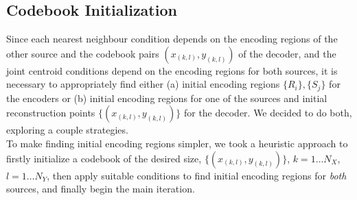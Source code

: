 



\subsection{Codebook Initialization}

Since each nearest neighbour condition depends on the encoding regions of the other source and the codebook pairs $(x_{(k,l)},y_{(k,l)})$ of the decoder, and the joint centroid conditions depend on the encoding regions for both sources, it is necessary to appropriately find either (a) initial encoding regions $\{R_i\}, \{S_j\}$ for the encoders or (b) initial encoding regions for one of the sources and initial reconstruction points $\{(x_{(k,l)}, y_{(k,l)})\}$ for the decoder. We decided to do both, exploring a couple strategies.\\


To make finding initial encoding regions simpler, we took a heuristic approach to firstly initialize a codebook of the desired size, $\{(x_{(k,l)}, y_{(k,l)})\}$, $k=1\ldots N_X$, $l=1\ldots N_Y$, then apply suitable conditions to find initial encoding regions for \emph{both} sources, and finally begin the main iteration.\\


